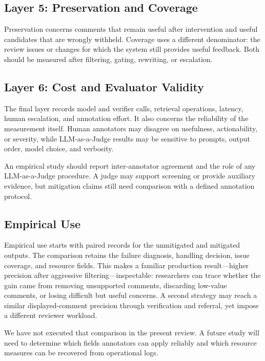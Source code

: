 \documentclass[10pt]{article}
\begin{document}
\subsection{Layer 5: Preservation and Coverage}

Preservation concerns comments that remain useful after intervention and useful candidates that are wrongly withheld. Coverage uses a different denominator: the review issues or changes for which the system still provides useful feedback. Both should be measured after filtering, gating, rewriting, or escalation.

\subsection{Layer 6: Cost and Evaluator Validity}

The final layer records model and verifier calls, retrieval operations, latency, human escalation, and annotation effort. It also concerns the reliability of the measurement itself. Human annotators may disagree on usefulness, actionability, or severity, while LLM-as-a-Judge results may be sensitive to prompts, output order, model choice, and verbosity.

An empirical study should report inter-annotator agreement and the role of any LLM-as-a-Judge procedure. A judge may support screening or provide auxiliary evidence, but mitigation claims still need comparison with a defined annotation protocol.

\subsection{Empirical Use}

Empirical use starts with paired records for the unmitigated and mitigated outputs. The comparison retains the failure diagnosis, handling decision, issue coverage, and resource fields. This makes a familiar production result---higher precision after aggressive filtering---inspectable: researchers can trace whether the gain came from removing unsupported comments, discarding low-value comments, or losing difficult but useful concerns. A second strategy may reach a similar displayed-comment precision through verification and referral, yet impose a different reviewer workload.

We have not executed that comparison in the present review. A future study will need to determine which fields annotators can apply reliably and which resource measures can be recovered from operational logs.
\end{document}
